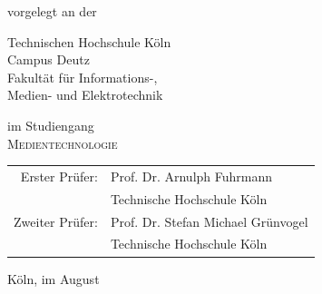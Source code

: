 \begin{titlepage}
\begin{center}
\vspace{1.2cm}


\vspace{0.6cm}

\begin{large}
vorgelegt an der\\ 
\vspace{0.2cm}
\begin{scshape}
Technischen Hochschule Köln\\
Campus Deutz\\
Fakultät für Informations-,\\
Medien- und Elektrotechnik\\

\end{scshape}
\end{large}

\vspace{0.6cm}

\begin{large}
im Studiengang\\ 
\vspace{0.1cm}
\textsc{Medientechnologie}
\end{large}


\vspace{1.2cm}

\begin{tabular}{rl}
        Erster Prüfer:  &  Prof. Dr. Arnulph Fuhrmann\\
       					&  \small Technische Hochschule Köln \\[1.0em]
       Zweiter Prüfer:  &  Prof. Dr. Stefan Michael Grünvogel\\
       					&  \small Technische Hochschule Köln\\
\end{tabular}

\vspace{1.2cm}

\begin{large}
Köln, im August \the\year
\end{large}


\end{center}
\end{titlepage}
